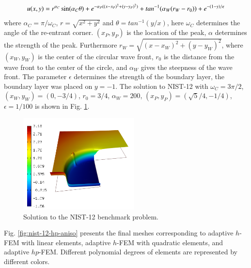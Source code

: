 \documentclass[12pt]{elsarticle}
\begin{document}
\[
u(x,y) =  r^{\alpha_{C} }\sin(\alpha_{C} \theta)
+ e^{-\alpha_{P} ((x - x_{P})^{2} + (y - y_{P})^{2})}
+ tan^{-1}(\alpha_{W} (r_{W} - r_{0})) \\
+ e^{-(1 - y) / \epsilon}
\]
where $\alpha_C = \pi / \omega_C$, $r = \sqrt{x^2+y^2}$
and $\theta = tan^{-1}(y/x)$, here $\omega_C$ determines
the angle of the re-entrant corner.
$(x_{P}, y_{P})$ is the location of the peak, $\alpha$
determines the strength of the peak. Furthermore
$r_{W} = \sqrt{(x - x_{W})^{2} + (y - y_{W})^{2}}$,
where $(x_{W}, y_{W})$ is the center of the circular wave front,
$r_{0}$ is the distance from the wave front to the
center of the circle, and $\alpha_W$ gives
the steepness of the wave front. The parameter $\epsilon$ determines the
strength of the boundary layer, the boundary layer was placed on $y = -1$.
The solution to NIST-12 with $\omega_C = 3 \pi /2$,
$(x_{W}, y_{W}) = (0, -3/4)$, $r_{0} = 3/4$, $\alpha_{W} = 200$,
$(x_{P}, y_{P}) = (\sqrt{5} / 4, -1/4)$,
$\epsilon = 1/100$ is shown in Fig. \ref{fig:sln-nist12}.

\begin{figure}[H]
\centering
\includegraphics[height=5cm]{nist/nist-12/solution.png}
\vspace{-3mm}
\caption{Solution to the NIST-12 benchmark problem.}
\vspace{-4mm}
\label{fig:sln-nist12}
\end{figure}

Fig. \ref{fig:nist-12-hp-aniso} presents the final meshes corresponding to adaptive $h$-FEM with 
linear elements, adaptive $h$-FEM with quadratic elements, and adaptive $hp$-FEM. Different 
polynomial degrees of elements are represented by different colors. 
\end{document}
